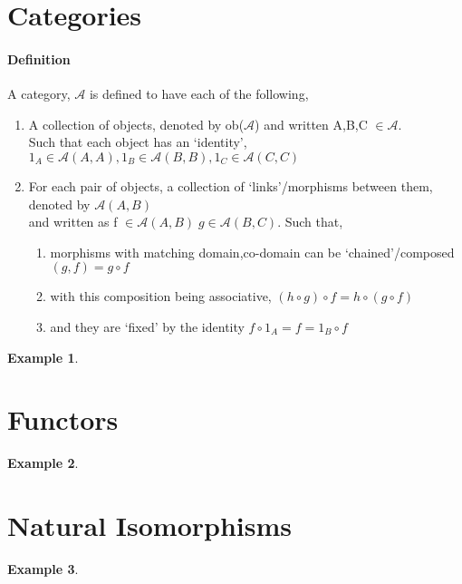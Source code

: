 \documentclass{article}
\newtheorem{example}{Example}[section]
\begin{document}
\section{Categories}
\label{sec:Categories}
\paragraph{Definition} A category, $\mathcal{A}$ is defined to have each of the following,
\begin{enumerate}[label=(\roman*)]
	\item A collection of objects, denoted by ob($\mathcal{A}$) and written A,B,C $\in \mathcal{A}$.\\
		Such that each object has an `identity', $ 1_A \in \mathcal{A}(A,A) , 1_B \in \mathcal{A}(B,B), 1_C \in \mathcal{A}(C,C)$
	\item For each pair of objects, a collection of `links'/morphisms between them, denoted by $\mathcal{A}(A,B)$ \\and written as f $ \in \mathcal{A}(A,B) \; g \in \mathcal{A}(B,C) $. Such that,
		\begin{enumerate}[label=(\alph*)]
			\item morphisms with matching domain,co-domain can be `chained'/composed $ (g,f)=g \circ f $
			\item with this composition being associative, $ (h \circ g)\circ f=h \circ ( g \circ f) $
			\item and they are `fixed' by the identity $ f \circ 1_A =f= 1_B \circ f $
		\end{enumerate}
\end{enumerate}

\label{par:dCategory}


\begin{example}

\end{example}
\section{Functors}
\label{sec:Functors}
\begin{example}
\end{example}

\section{Natural Isomorphisms}
\label{sec:Natural Isomorphisms}
\begin{example}
\end{example}
\end{document}

